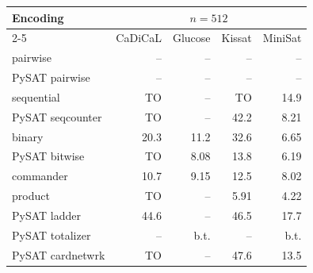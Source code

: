 \begin{tabular}{@{}lrrrr@{}}
\toprule
Encoding & \multicolumn{4}{c}{$n=512$} \\
\cmidrule(lr){2-5}
 & CaDiCaL & Glucose & Kissat & MiniSat \\
\midrule
pairwise & -- & -- & -- & -- \\
PySAT pairwise & -- & -- & -- & -- \\
sequential & TO & -- & TO & 14.9 \\
PySAT seqcounter & TO & -- & 42.2 & 8.21 \\
binary & 20.3 & 11.2 & 32.6 & 6.65 \\
PySAT bitwise & TO & 8.08 & 13.8 & 6.19 \\
commander & 10.7 & 9.15 & 12.5 & 8.02 \\
product & TO & -- & 5.91 & 4.22 \\
\midrule
PySAT ladder & 44.6 & -- & 46.5 & 17.7 \\
PySAT totalizer & -- & b.t. & -- & b.t. \\
PySAT cardnetwrk & TO & -- & 47.6 & 13.5 \\
\bottomrule
\end{tabular}
